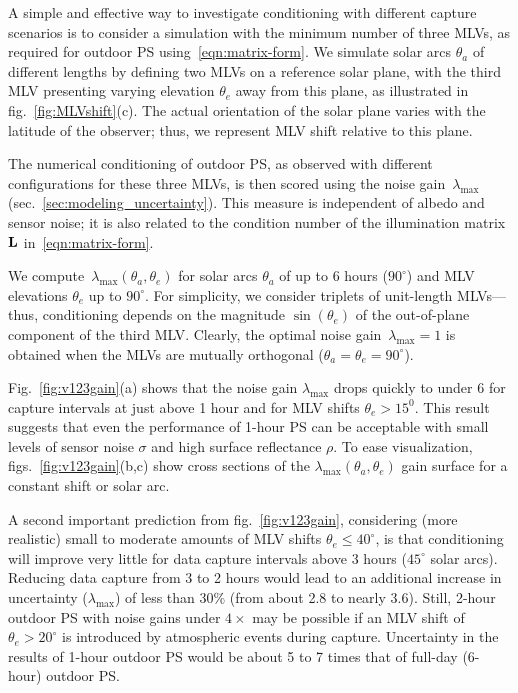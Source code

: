 A simple and effective way to investigate conditioning with different capture scenarios is to consider a simulation with the minimum number of three MLVs, as required for outdoor PS using~\eqref{eqn:matrix-form}. We simulate solar arcs $\theta_a$ of different lengths by defining two MLVs on a reference solar plane, with the third MLV presenting varying elevation $\theta_e$ away from this plane, as illustrated in fig.~\ref{fig:MLVshift}(c). The actual orientation of the solar plane varies with the latitude of the observer; thus, we represent MLV shift relative to this plane.

The numerical conditioning of outdoor PS, as observed with different configurations for these three MLVs, is then scored using the noise gain~$\lambda_{\max}$ (sec.~\ref{sec:modeling_uncertainty}). This measure is independent of albedo and sensor noise; it is also related to the condition number of the illumination matrix ${\bf L}$ in~\eqref{eqn:matrix-form}.



We compute~$\lambda_{\max}(\theta_a,\theta_e)$ for solar arcs $\theta_a$ of up to 6 hours ($90^\circ$) and MLV elevations $\theta_e$ up to $90^\circ$. For simplicity, we consider triplets of unit-length MLVs---thus, conditioning depends on the magnitude $\sin(\theta_e)$ of the out-of-plane component of the third MLV. Clearly, the optimal noise gain~$\lambda_{\max} = 1$ is obtained when the MLVs are mutually orthogonal ($\theta_a = \theta_e = 90^\circ$).

Fig.~\ref{fig:v123gain}(a) shows that the noise gain $\lambda_{\max}$ drops quickly to under 6 for capture intervals at just above 1 hour and for MLV shifts $\theta_e > 15^0$. This result suggests that even the performance of 1-hour PS can be acceptable with small levels of sensor noise $\sigma$ and high surface reflectance $\rho$. To ease visualization, figs.~\ref{fig:v123gain}(b,c) show cross sections of the $\lambda_{\max}(\theta_a,\theta_e)$ gain surface for a constant shift or solar arc.

A second important prediction from fig.~\ref{fig:v123gain}, considering (more realistic) small to moderate amounts of MLV shifts $\theta_e \leq 40^\circ$, is that conditioning will improve very little for data capture intervals above 3 hours ($45^\circ$ solar arcs). Reducing data capture from 3 to 2 hours would lead to an additional increase in uncertainty ($\lambda_{\max}$) of less than $30\%$ (from about 2.8 to nearly 3.6). Still, 2-hour outdoor PS with noise gains under $4\times$ may be possible if an MLV shift of $\theta_e > 20^\circ$ is introduced by atmospheric events during capture. Uncertainty in the results of 1-hour outdoor PS would be about 5 to 7 times that of full-day (6-hour) outdoor PS.


